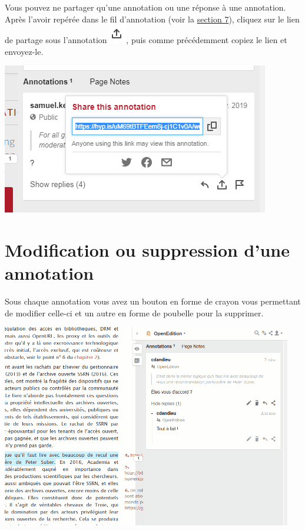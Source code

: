 \documentclass[
]{book}
\begin{document}
Vous pouvez ne partager qu'une annotation ou une réponse à une annotation. Après l'avoir repérée dans le fil d'annotation (voir la \protect\hyperlink{s7}{section 7}), cliquez sur le lien de partage sous l'annotation \includegraphics{img/9ed8e6410bcd25e02923bf774a7fb2fe.png}, puis comme précédemment copiez le lien et envoyez-le.

\includegraphics{img/cb6bdc80ca52dfbde7f2cb85ae981643.png}

\hypertarget{s5}{%
\chapter{Modification ou suppression d'une annotation}\label{s5}}

Sous chaque annotation vous avez un bouton en forme de crayon vous permettant de modifier celle-ci et un autre en forme de poubelle pour la supprimer.

\includegraphics{img/523575cc7eaccc9577140afd392b9710.gif}
\end{document}
